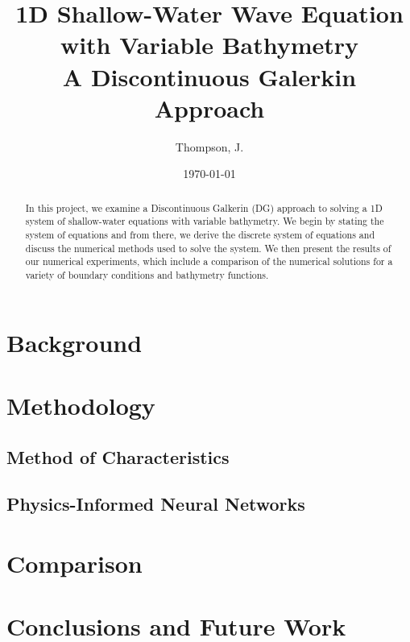 \documentclass[letterpaper,11pt]{article}
\begin{document}
    \title{%
        1D Shallow-Water Wave Equation with Variable Bathymetry\\
        \large A Discontinuous Galerkin Approach
    }
    \author{%
        Thompson, J.
    }
    \date{\today}
    \maketitle

    \begin{abstract}
        In this project, we examine a Discontinuous Galkerin (DG) approach to solving a 1D system of shallow-water
        equations with variable bathymetry. We begin by stating the system of equations and from there, we derive the 
        discrete system of equations and discuss the numerical methods used to solve the system. We then present the 
        results of our numerical experiments, which include a comparison of the numerical solutions for a variety of
        boundary conditions and bathymetry functions.
    \end{abstract}

    \section{Background}\label{sec:background}

    

    \section{Methodology}\label{sec:proposed-methodology}

    \subsection{Method of Characteristics}\label{subset:moc-methodology}

    

    \subsection{Physics-Informed Neural Networks}\label{subsec:pinn-methodology}

    \section{Comparison}\label{sec:comparison}

    \section{Conclusions and Future Work}\label{sec:conclusion}

    \pagebreak

    
    

    \pagebreak
    \appendix
    
\end{document}
